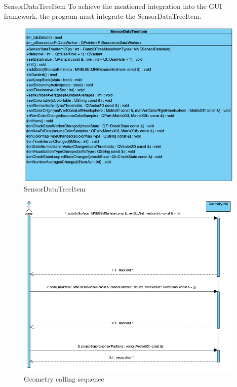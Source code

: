 \documentclass[a4paper, 11pt, english, fleqn]{article}
\begin{document}
\begin{aims}
\item[SensorDataTreeItem] To achieve the mentioned integration into the GUI framework, the program must integrate the SensorDataTreeItem.

\begin{figure}[h]
	\begin{center}
		\includegraphics[width=12cm]{figures/sensordatatreeitemclassdiagram.png}
		\caption{SensorDataTreeItem}
	\end{center}
\end{figure}

\end{aims}

\begin{figure}[h]
	\begin{center}
		\includegraphics[width=12cm]{figures/geometryinfo_calling_sequence.png}
		\caption{Geometry calling sequence}
	\end{center}
\end{figure}
\end{document}
